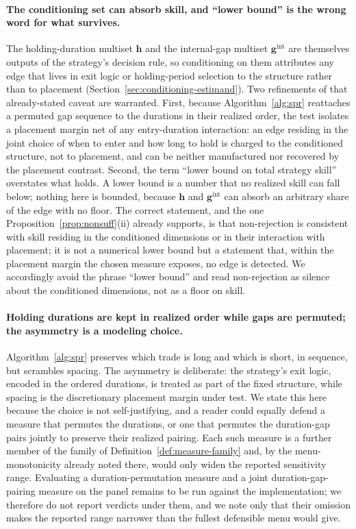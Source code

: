 \documentclass[preprint,12pt]{elsarticle}
\theoremstyle{definition}
\begin{document}
\paragraph{The conditioning set can absorb skill, and ``lower bound'' is the wrong
word for what survives.} The holding-duration multiset $\mathbf{h}$ and the
internal-gap multiset $\mathbf{g}^{\mathrm{int}}$ are themselves outputs of the
strategy's decision rule, so conditioning on them attributes any edge that lives in
exit logic or holding-period selection to the structure rather than to placement
(Section~\ref{sec:conditioning-estimand}). Two refinements of that already-stated
caveat are warranted. First, because Algorithm~\ref{alg:spr} reattaches a permuted gap
sequence to the durations in their realized order, the test isolates a placement
margin net of any entry-duration interaction: an edge residing in the joint choice of
when to enter and how long to hold is charged to the conditioned structure, not to
placement, and can be neither manufactured nor recovered by the placement contrast.
Second, the term ``lower bound on total strategy skill'' overstates what holds. A
lower bound is a number that no realized skill can fall below; nothing here is bounded,
because $\mathbf{h}$ and $\mathbf{g}^{\mathrm{int}}$ can absorb an arbitrary share of
the edge with no floor. The correct statement, and the one
Proposition~\ref{prop:nonsuff}(ii) already supports, is that non-rejection is
consistent with skill residing in the conditioned dimensions or in their interaction
with placement; it is not a numerical lower bound but a statement that, within the
placement margin the chosen measure exposes, no edge is detected. We accordingly avoid
the phrase ``lower bound'' and read non-rejection as silence about the conditioned
dimensions, not as a floor on skill.

\paragraph{Holding durations are kept in realized order while gaps are permuted; the
asymmetry is a modeling choice.} Algorithm~\ref{alg:spr} preserves which trade is long
and which is short, in sequence, but scrambles spacing. The asymmetry is deliberate:
the strategy's exit logic, encoded in the ordered durations, is treated as part of the
fixed structure, while spacing is the discretionary placement margin under test. We
state this here because the choice is not self-justifying, and a reader could equally
defend a measure that permutes the durations, or one that permutes the duration-gap
pairs jointly to preserve their realized pairing. Each such measure is a further member
of the family of Definition~\ref{def:measure-family} and, by the menu-monotonicity
already noted there, would only widen the reported sensitivity range. Evaluating a
duration-permutation measure and a joint duration-gap-pairing measure on the panel
remains to be run against the implementation; we therefore do not report verdicts under
them, and we note only that their omission makes the reported range narrower than the
fullest defensible menu would give.
\end{document}
